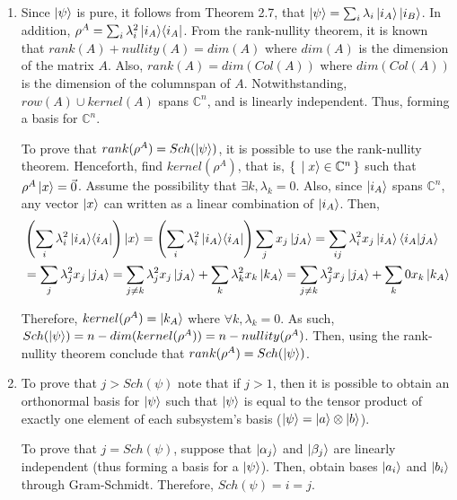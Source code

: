 \begin{enumerate}
    \item Since $\ket{\psi}$ is pure, it follows from Theorem 2.7, that
    $\ket{\psi} = \sum_i \lambda_i \ket{i_A} \ket{i_B}$.
    In addition, $\rho^A = \sum_i \lambda_i^2 \mathop{\mathinner{ |{i_A}\rangle \langle{i_A}|}}$.
    From the rank-nullity theorem, it is known that
    $rank(A) + nullity(A) = dim(A)$ where $dim(A)$ is the dimension of the matrix $A$.
    Also, $rank(A) = dim(Col(A))$ where $dim(Col(A))$ is the dimension of the columnspan of $A$.
    Notwithstanding, $row(A) \cup kernel(A)$ spans $\mathbb{C}^n$, and is linearly independent.
    Thus, forming a basis for $\mathbb{C}^n$.

    To prove that $rank(\rho^A) = Sch(\ket{\psi})$,
    it is possible to use the rank-nullity theorem.
    Henceforth, find $kernel(\rho^A)$,
    that is, $\set{\ket{x} \in \mathbb{C}^n}$ such that $\rho^A \ket{x} = \vec{0}$.
    Assume the possibility that $\exists k, \lambda_k = 0$.
    Also, since $\ket{i_A}$ spans $\mathbb{C}^n$,
    any vector $\ket{x}$ can written as a linear combination of $\ket{i_A}$.
    Then,
    \begin{align}
        &\left( \sum_i \lambda_i^2 \mathop{\mathinner{ |{i_A}\rangle \langle{i_A}|}} \right) \ket{x}
        = \left( \sum_i \lambda_i^2 \mathop{\mathinner{ |{i_A}\rangle \langle{i_A}|}} \right) \sum_j x_j \ket{j_A}
        = \sum_{ij} \lambda_i^2 x_j \ket{i_A} \mathop{\mathinner{ \langle{i_A}|{j_A}\rangle}} \\
        &= \sum_j \lambda_j^2 x_j \ket{j_A}
        = \sum_{j \neq k} \lambda_j^2 x_j \ket{j_A} + \sum_k \lambda_k^2 x_k \ket{k_A}
        = \sum_{j \neq k} \lambda_j^2 x_j \ket{j_A} + \sum_k 0 x_k \ket{k_A}
    \end{align}
    
    Therefore, $kernel(\rho^A) = \ket{k_A}$ where $\forall k, \lambda_k = 0$.
    As such, $Sch(\ket{\psi}) = n - dim(kernel(\rho^A)) = n - nullity(\rho^A)$.
    Then, using the rank-nullity theorem conclude that $rank(\rho^A) = Sch(\ket{\psi})$.

    \dotfill

    \item To prove that $j > Sch(\psi)$ note that if $j > 1$,
    then it is possible to obtain an orthonormal basis for $\ket{\psi}$
    such that $\ket{\psi}$ is equal to the tensor product of
    exactly one element of each subsystem's basis
    ($\ket{\psi} = \ket{a} \otimes \ket{b}$).
    
    To prove that $j = Sch(\psi)$, suppose that $\ket{\alpha_j}$ and $\ket{\beta_j}$
    are linearly independent (thus forming a basis for a $\ket{\psi}$).
    Then, obtain bases $\ket{a_i}$ and $\ket{b_i}$ through Gram-Schmidt.
    Therefore, $Sch(\psi) = i = j$.
    

\end{enumerate}
